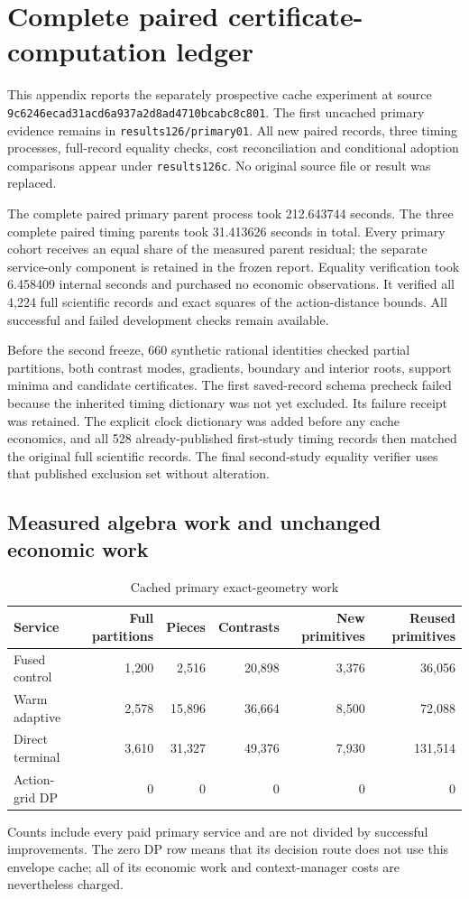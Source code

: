 \section{Complete paired certificate-computation ledger}\label{sec:cachedev126}
This appendix reports the separately prospective cache experiment at source \nolinkurl{9c6246ecad31acd6a937a2d8ad4710bcabc8c801}. The first uncached primary evidence remains in \texttt{results126/primary01}. All new paired records, three timing processes, full-record equality checks, cost reconciliation and conditional adoption comparisons appear under \texttt{results126c}. No original source file or result was replaced.

The complete paired primary parent process took 212.643744 seconds. The three complete paired timing parents took 31.413626 seconds in total. Every primary cohort receives an equal share of the measured parent residual; the separate service-only component is retained in the frozen report. Equality verification took 6.458409 internal seconds and purchased no economic observations. It verified all 4,224 full scientific records and exact squares of the action-distance bounds. All successful and failed development checks remain available.

Before the second freeze, 660 synthetic rational identities checked partial partitions, both contrast modes, gradients, boundary and interior roots, support minima and candidate certificates. The first saved-record schema precheck failed because the inherited timing dictionary was not yet excluded. Its failure receipt was retained. The explicit clock dictionary was added before any cache economics, and all 528 already-published first-study timing records then matched the original full scientific records. The final second-study equality verifier uses that published exclusion set without alteration.

\subsection{Measured algebra work and unchanged economic work}
\begin{table}[h]\centering\caption{Cached primary exact-geometry work}\label{tab:cachework126}
\begin{tabular}{lrrrrr}\toprule
Service & Full partitions & Pieces & Contrasts & New primitives & Reused primitives\\\midrule
Fused control & 1,200 & 2,516 & 20,898 & 3,376 & 36,056\\
Warm adaptive & 2,578 & 15,896 & 36,664 & 8,500 & 72,088\\
Direct terminal & 3,610 & 31,327 & 49,376 & 7,930 & 131,514\\
Action-grid DP & 0 & 0 & 0 & 0 & 0\\
\bottomrule\end{tabular}
\par\smallskip\footnotesize Counts include every paid primary service and are not divided by successful improvements. The zero DP row means that its decision route does not use this envelope cache; all of its economic work and context-manager costs are nevertheless charged.
\end{table}

